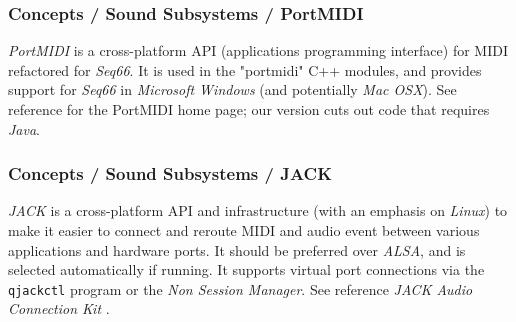 \subsubsection{Concepts / Sound Subsystems / PortMIDI}
\label{subsubsec:concepts_sound_portmidi}

   \textsl{PortMIDI} is a cross-platform API (applications programming
   interface) for MIDI refactored for \textsl{Seq66}.
   It is used in the "portmidi" C++ modules, and provides support for
   \textsl{Seq66} in \textsl{Microsoft Windows} (and potentially
   \textsl{Mac OSX}).
   See reference \cite{portmidi} for the PortMIDI home page; our version
   cuts out code that requires \textsl{Java}.

\subsubsection{Concepts / Sound Subsystems / JACK}
\label{subsubsec:concepts_sound_jack}

   \textsl{JACK} is a cross-platform
   API and infrastructure
   (with an emphasis on \textsl{Linux})
   to make it easier to connect and reroute MIDI
   and audio event between various applications and hardware ports.
   It should be preferred over \textsl{ALSA}, and is selected automatically if
   running.
   It supports virtual port connections via the \texttt{qjackctl} program or
   the \textsl{Non Session Manager}.
   See reference \textsl{JACK Audio Connection Kit} \cite{jack}.

